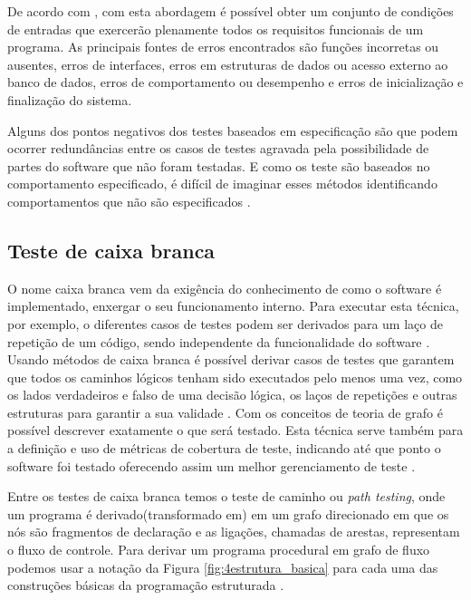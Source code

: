 De acordo com \cite{pressman2005software}, com  esta abordagem é possível obter um conjunto de condições de entradas que exercerão plenamente todos os requisitos funcionais de um programa. As principais fontes de erros encontrados são funções incorretas ou ausentes, erros de interfaces, erros em estruturas de dados ou acesso externo ao banco de dados, erros de comportamento ou desempenho e erros de inicialização e finalização do sistema.

Alguns dos pontos negativos dos testes baseados em especificação são que podem ocorrer redundâncias entre os casos de testes agravada pela possibilidade de partes do software que não foram testadas. E como os teste são baseados no comportamento especificado, é difícil de imaginar esses métodos identificando comportamentos que não são especificados \cite{jorgensen2016software}.

\subsection{Teste de caixa branca}

O nome caixa branca vem da exigência do conhecimento de como o software é implementado, enxergar o seu funcionamento interno. Para executar esta técnica, por exemplo, o diferentes casos de testes podem ser derivados para um laço de repetição de um código, sendo independente da funcionalidade do software \cite{graham2008foundations}. Usando métodos de caixa branca é possível derivar casos de testes que garantem que todos os caminhos lógicos tenham sido executados pelo menos uma vez, como os lados verdadeiros e falso de uma decisão lógica, os laços de repetições e outras estruturas para garantir a sua validade \cite{pressman2005software}. Com os conceitos de teoria de grafo é possível descrever exatamente o que será testado. Esta técnica serve também para a definição e uso de métricas de cobertura de teste, indicando até que ponto o software foi testado oferecendo assim um melhor gerenciamento de teste \cite{jorgensen2016software}.

Entre os testes de caixa branca temos o teste de caminho ou \textit{path testing}, onde um programa é derivado(transformado em) em um grafo direcionado em que os nós são fragmentos de declaração e as ligações, chamadas de arestas, representam o fluxo de controle. Para derivar um programa procedural em grafo de fluxo podemos usar a notação da Figura \ref{fig:4estrutura_basica} para cada uma das construções básicas da programação estruturada \cite{jorgensen2016software}.

